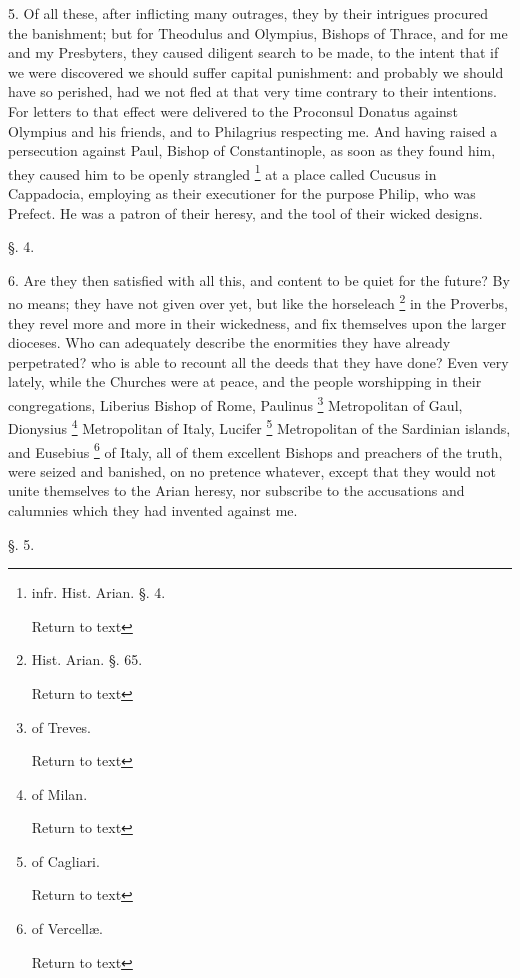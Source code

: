 5. Of all these, after inflicting many outrages,
they by their intrigues procured the banishment; but for Theodulus and
Olympius, Bishops of Thrace, and for me and my Presbyters, they caused
diligent search to be made, to the intent that if we were discovered
we should suffer capital punishment: and probably we should have
so perished, had we not fled at that very time contrary to their
intentions. For letters to that effect were delivered to the Proconsul
Donatus against Olympius and his friends, and to Philagrius respecting
me. And having raised a persecution against Paul, Bishop of
Constantinople, as soon as they found him, they caused him to be
openly strangled \footnote{infr. Hist. Arian. §. 4.

Return to text} at a
place called Cucusus in Cappadocia, employing as their executioner for
the purpose Philip, who was Prefect. He was a patron of their heresy,
and the tool of their wicked designs.

§. 4.

6. Are they then satisfied with all this, and
content to be quiet for the future? By no means; they have not given
over yet, but like the horseleach \footnote{Hist. Arian. §. 65.

Return to text} in the Proverbs, they revel more and more in their wickedness,
and fix themselves upon the larger dioceses. Who can adequately
describe the enormities they have already perpetrated? who is able to
recount all the deeds that they have done? Even very lately, while the
Churches were at peace, and the people worshipping in their
congregations, Liberius Bishop of Rome, Paulinus \footnote{of Treves.

Return to text} Metropolitan of Gaul, Dionysius \footnote{of Milan.

Return to text} Metropolitan of Italy, Lucifer \footnote{of Cagliari.

Return to text} Metropolitan of the Sardinian islands, and Eusebius \footnote{of Vercellæ.

Return to text} of Italy, all of them excellent Bishops and preachers of the
truth, were seized and banished, on no pretence whatever, except that
they would not unite themselves to the Arian heresy, nor subscribe to
the accusations and calumnies which they had invented against me.

§. 5.

